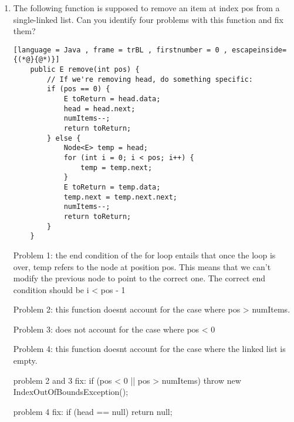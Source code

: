 \documentclass[letter]{article}
\begin{document}
\begin{enumerate}[1.]
\begin{lstlisting}[language = Java , frame = trBL , firstnumber = 0 , escapeinside={(*@}{@*)}]
            while (temp.next != null) {
                temp = temp.next;
                numItems++;
            }
            //After while loop ends, temp is the last node in the newList
            temp.next = temp2;
        }
    }
    \end{lstlisting}

    \newpage
    \item The following function is supposed to remove an item at index pos from a single-linked list. Can you identify four problems with this function and fix them?

        
    \begin{lstlisting}[language = Java , frame = trBL , firstnumber = 0 , escapeinside={(*@}{@*)}]
    public E remove(int pos) {
        // If we're removing head, do something specific:
        if (pos == 0) {
            E toReturn = head.data;
            head = head.next;
            numItems--;
            return toReturn;
        } else {
            Node<E> temp = head;
            for (int i = 0; i < pos; i++) {
                temp = temp.next;
            }
            E toReturn = temp.data;
            temp.next = temp.next.next;
            numItems--;
            return toReturn;
        }
    }
    \end{lstlisting}

    Problem 1: the end condition of the for loop entails that once the loop is over, temp refers to the node at position pos. This means that we can't modify the previous node to point to the correct one. The correct end condition should be i < pos - 1
    
    Problem 2: this function doesnt account for the case where pos > numItems. 
    
    Problem 3: does not account for the case where pos < 0
    
    Problem 4: this function doesnt account for the case where the linked list is empty.

    problem 2 and 3 fix: if (pos < 0 || pos > numItems) { throw new IndexOutOfBoundsException(); }

    problem 4 fix: if (head == null) {
            return null;
        }
    
    
\end{enumerate}
\end{document}
